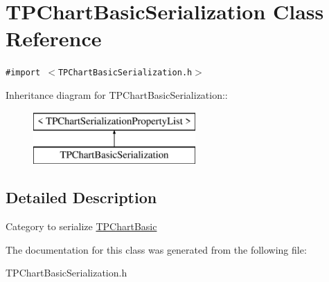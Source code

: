 \hypertarget{interface_t_p_chart_basic_serialization}{
\section{TPChartBasicSerialization Class Reference}
\label{interface_t_p_chart_basic_serialization}
}
{\tt \#import $<$TPChartBasicSerialization.h$>$}

Inheritance diagram for TPChartBasicSerialization::\begin{figure}[H]
\begin{center}
\leavevmode
\includegraphics[height=2cm]{interface_t_p_chart_basic_serialization}
\end{center}
\end{figure}


\subsection{Detailed Description}
Category to serialize \hyperlink{interface_t_p_chart_basic}{TPChartBasic} 

The documentation for this class was generated from the following file:\begin{CompactItemize}
\item 
TPChartBasicSerialization.h\end{CompactItemize}
